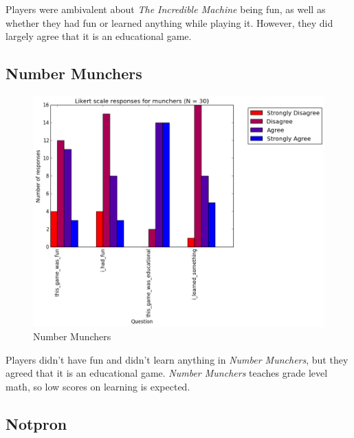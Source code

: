 				Players were ambivalent about \textit{The Incredible Machine} being fun, as well as whether they had fun or learned anything while playing it. However, they did largely agree that it is an educational game.

			\subsection{Number Munchers}

				\begin{figure}[] 
				\centering 
				\includegraphics[width=\textwidth, height=.4\textheight, keepaspectratio=true]{munchers_likert.png} 
				\caption{Number Munchers}
				\end{figure}

				Players didn't have fun and didn't learn anything in \textit{Number Munchers}, but they agreed that it is an educational game. \textit{Number Munchers} teaches grade level math, so low scores on learning is expected.

			\subsection{Notpron}

